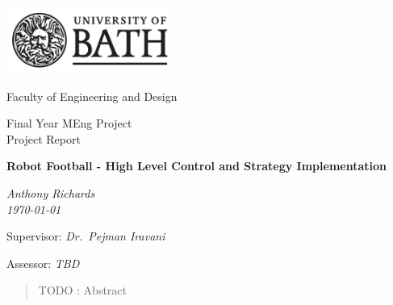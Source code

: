 \begin{titlepage}
  \setlength{\parindent}{0cm}

  \includegraphics[width=200px]{Images/uob-logo-black-transparent}

  \Large
  Faculty of Engineering and Design

  \vspace{80pt}

  \LARGE
  Final Year MEng Project \\
  Project Report

  \vspace{80pt}
  \textbf{Robot Football - High Level Control and Strategy Implementation}

  \vspace{10pt}
  \emph{Anthony Richards} \\
  \emph{\today}

  \vspace{80pt}
  Supervisor: \emph{Dr.~Pejman Iravani}

  \vspace{10pt}
  Assessor: \emph{TBD}
\end{titlepage}


\begin{abstract}
\acresetall
TODO : Abstract
\end{abstract}

\tableofcontents

\acresetall



\cleardoublepage

